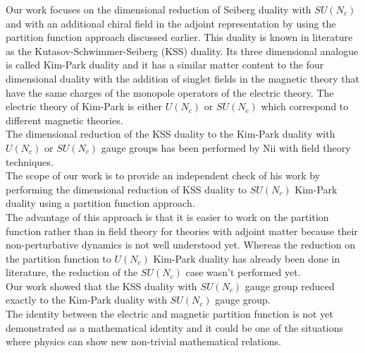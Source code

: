 Our work focuses on the dimensional reduction of Seiberg duality with $SU(N_c)$ and with an additional chiral field in the adjoint representation by using the partition function approach discussed earlier.
This duality is known in literature as the Kutasov-Schwimmer-Seiberg (KSS) duality.
Its three dimensional analogue is called Kim-Park duality and it has a similar matter content to the four dimensional duality with the addition of singlet fields in the magnetic theory that have the same charges of the monopole operators of the electric theory.
The electric theory of Kim-Park is either $U(N_c)$ or $SU(N_c)$ which correspond to different magnetic theories. 
 \\
The dimensional reduction of the KSS duality to the Kim-Park duality with $U(N_c)$ or $SU(N_c)$ gauge groups has been performed by Nii with field theory techniques.\\
The scope of our work is to provide an independent check of his work by performing the dimensional reduction of KSS duality to $SU(N_c)$ Kim-Park duality using a partition function approach.\\
The advantage of this approach is that it is easier to work on the partition function rather than in field theory for theories with adjoint matter because their non-perturbative dynamics is not well understood yet.
Whereas the reduction on the partition function to $U(N_c)$ Kim-Park duality has already been done in literature, the reduction of the $SU(N_c)$ case wasn't performed yet.\\
Our work showed that the KSS duality with $SU(N_c)$ gauge group reduced exactly to the Kim-Park duality with $SU(N_c)$ gauge group.\\
The identity between the electric and magnetic partition function is not yet demonstrated as a mathematical identity and it could be one of the situations where physics can show new non-trivial mathematical relations. 
\\


